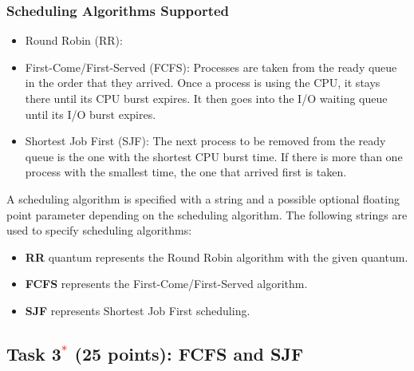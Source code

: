 \documentclass[16pt]{article}
\begin{document}
\subsubsection*{Scheduling Algorithms Supported}

\begin{itemize}
\item  Round Robin (RR):
\item  First-Come/First-Served (FCFS): Processes are taken from the ready queue in
   the order that they arrived. Once a process is using the CPU, it stays there until its
  CPU burst expires. It then goes into the I/O waiting queue until its I/O burst
 expires.
\item  Shortest Job First (SJF): The next process to be removed from the ready queue
   is the one with the shortest CPU burst time. If there is more than one process with
  the smallest time, the one that arrived first is taken.
\end{itemize}
A scheduling algorithm is specified with a string and a possible optional floating point
parameter depending on the scheduling algorithm. The following strings are used to
specify scheduling algorithms:

\begin{itemize}
\item \textbf{RR} quantum represents the Round Robin algorithm with the given quantum.
\item \textbf{FCFS} represents the First-Come/First-Served algorithm.
\item \textbf{SJF} represents Shortest Job First scheduling.
\end{itemize}

\newpage
\subsection*{Task 3\textcolor{red}{$^{*}$} (25 points): FCFS and SJF}
\end{document}
